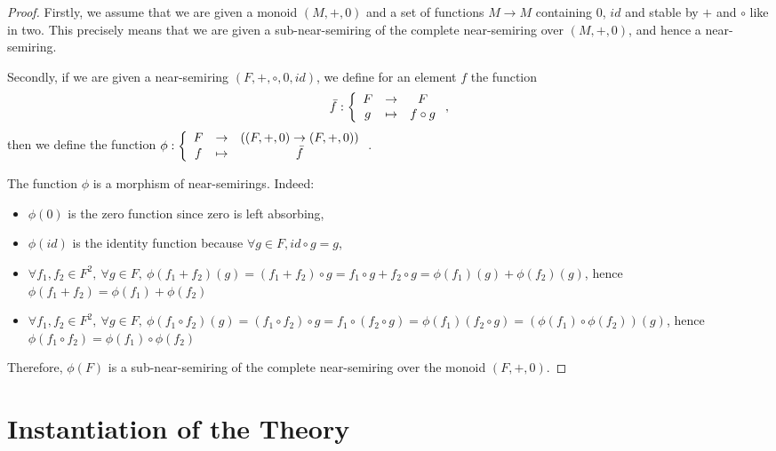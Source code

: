 \documentclass[11pt,a4paper]{article}
\theoremstyle{definition}
\begin{document}
\begin{proof}

	Firstly, we assume that we are given a monoid $(M,+,0)$ and a set of functions $M \to M$ containing $0$, $id$ and stable by $+$ and $\circ$ like in two. This precisely means that we are given a sub-near-semiring of the complete near-semiring over $(M,+,0)$, and hence a near-semiring.
	
	Secondly, if we are given a near-semiring $(F,+,\circ,0,id)$, we define for an element $f$ the function 
	$$\bar{f} : \left\{ 
	\begin{array}{c c c}
		F & \to & F \\
		g & \mapsto & f \circ g
	\end{array} \right. ,$$
	then we define the function $\phi : \left\{ 
	\begin{array}{c c c}
		F & \to & ((F,+,0) \to (F,+,0)) \\
		f & \mapsto & \bar{f}
	\end{array} \right.$. 
	
	The function $\phi$ is a morphism of near-semirings. Indeed: 
	\begin{itemize}
	
		\item $\phi(0)$ is the zero function since zero is left absorbing,
		
		\item $\phi(id)$ is the identity function because $\forall g \in F,id \circ g= g$,
		
		\item $\forall f_1,f_2 \in F^2,\ \forall g \in F,\ \phi(f_1 + f_2)(g)=(f_1 + f_2) \circ g = f_1 \circ g + f_2 \circ g = \phi(f_1)(g) + \phi (f_2)(g)$, hence $\phi(f_1+f_2)=\phi(f_1)+\phi(f_2)$
		
		\item $\forall f_1,f_2 \in F^2,\ \forall g \in F,\ \phi(f_1 \circ f_2)(g)=(f_1 \circ f_2) \circ g = f_1 \circ (f_2 \circ g) = \phi(f_1)(f_2 \circ g) = (\phi(f_1) \circ \phi(f_2))(g) $, hence $\phi(f_1 \circ f_2)=\phi(f_1) \circ \phi(f_2)$
	
	\end{itemize}
	Therefore, $\phi(F)$ is a sub-near-semiring of the complete near-semiring over the monoid $(F,+,0)$.

\end{proof}


\section{Instantiation of the Theory}
\end{document}
